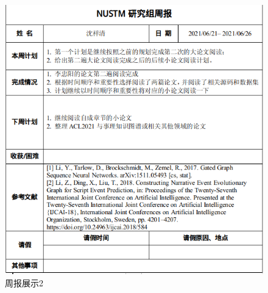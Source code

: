\documentclass[10pt,aspectratio=43,mathserif]{beamer}
\begin{document}
\begin{frame}
\begin{columns}[b]
                \begin{figure}
                    \centering
                    \includegraphics[width=1.1\textwidth]{figures/report2.png}
                    \caption{周报展示2}
                    \label{fig:report2}
                \end{figure}


\end{columns}
\end{frame}
\end{document}
